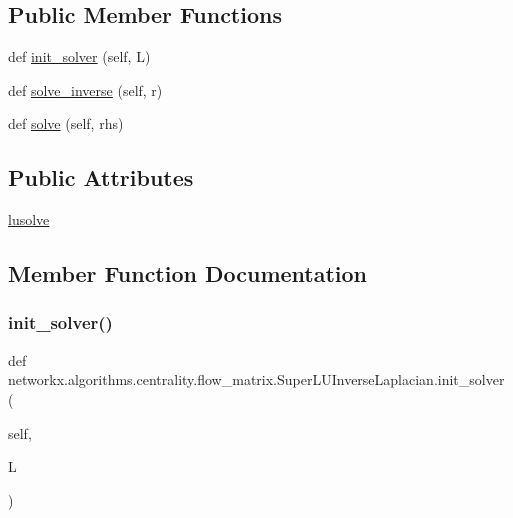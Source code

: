 \subsection*{Public Member Functions}
\begin{DoxyCompactItemize}
\item 
def \hyperlink{classnetworkx_1_1algorithms_1_1centrality_1_1flow__matrix_1_1SuperLUInverseLaplacian_ac851ac69d69ee92eaa4743c71619b52e}{init\+\_\+solver} (self, L)
\item 
def \hyperlink{classnetworkx_1_1algorithms_1_1centrality_1_1flow__matrix_1_1SuperLUInverseLaplacian_a6027d266112778ec17ebe52b28dfa877}{solve\+\_\+inverse} (self, r)
\item 
def \hyperlink{classnetworkx_1_1algorithms_1_1centrality_1_1flow__matrix_1_1SuperLUInverseLaplacian_adb4f01c15b9f8636463038e977eced1c}{solve} (self, rhs)
\end{DoxyCompactItemize}
\subsection*{Public Attributes}
\begin{DoxyCompactItemize}
\item 
\hyperlink{classnetworkx_1_1algorithms_1_1centrality_1_1flow__matrix_1_1SuperLUInverseLaplacian_ad3ae088f2e349bd531e9f029b9207484}{lusolve}
\end{DoxyCompactItemize}


\subsection{Member Function Documentation}
\mbox{\label{classnetworkx_1_1algorithms_1_1centrality_1_1flow__matrix_1_1SuperLUInverseLaplacian_ac851ac69d69ee92eaa4743c71619b52e}} 
\subsubsection{\texorpdfstring{init\+\_\+solver()}{init\_solver()}}
{\footnotesize\ttfamily def networkx.\+algorithms.\+centrality.\+flow\+\_\+matrix.\+Super\+L\+U\+Inverse\+Laplacian.\+init\+\_\+solver (\begin{DoxyParamCaption}\item[{}]{self,  }\item[{}]{L }\end{DoxyParamCaption})}

